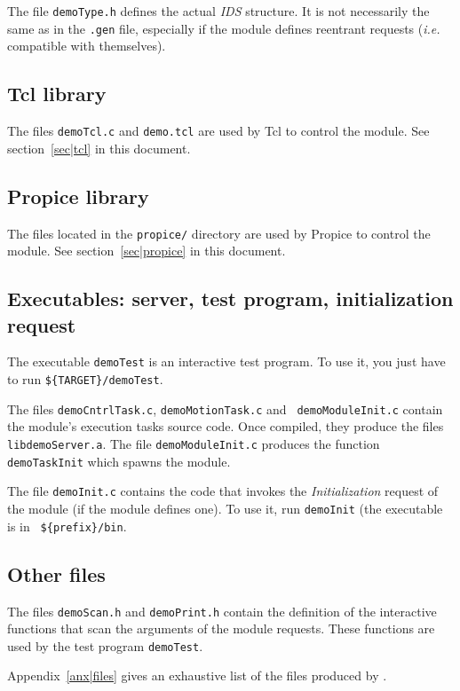 The file {\tt  demoType.h} defines the actual {\em  IDS} structure. It is
not necessarily the same as  in the  {\tt .gen}  file, especially if  the
module   defines   reentrant   requests   ({\em  i.e.}   compatible  with
themselves).

\subsection{Tcl library}

The files  {\tt demoTcl.c} and {\tt demo.tcl}  are used by Tcl to control
the module. See section~\ref{sec|tcl} in this document.


\subsection{Propice library}

The files located in the {\tt propice/} directory are  used by Propice to
control the module. See section~\ref{sec|propice} in this document.


\subsection{Executables: server, test program, initialization request}

The executable {\tt demoTest} is an interactive test program. To use it,
you just have to  run
{\tt \$\{TARGET\}/demoTest}.

The  files    {\tt demoCntrlTask.c},   {\tt demoMotionTask.c}    and {\tt
demoModuleInit.c} contain the module's execution tasks source code.  Once
compiled, they produce the  files  {\tt
libdemoServer.a}.  The   file  {\tt demoModuleInit.c} produces    the
function {\tt demoTaskInit} which spawns the module.

The file {\tt demoInit.c} contains the code that invokes the {\em
Initialization} request of the module (if the module defines one). To use
it, run {\tt demoInit} (the executable is in {\tt
\$\{prefix\}/bin}.


\subsection{Other files}

The  files {\tt demoScan.h} and {\tt  demoPrint.h} contain the definition
of  the interactive   functions  that scan  the  arguments  of the module
requests. These functions are used by the test program {\tt demoTest}.

Appendix~\ref{anx|files} gives an exhaustive list  of the files  produced
by \GenoM.
